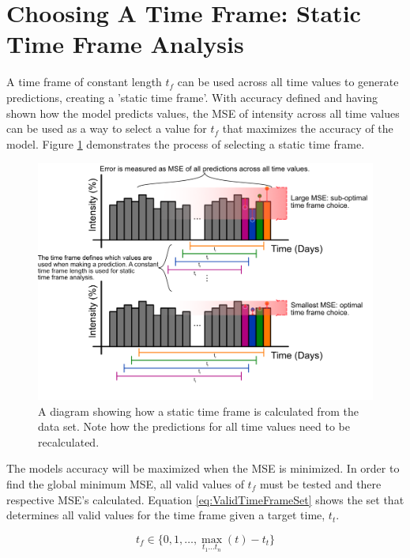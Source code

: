 \section{Choosing A Time Frame: Static Time Frame Analysis}
\label{sec:TimeFrameStaticTimeFrameAnalysis}

A time frame of constant length $t_f$ can be used across all time values to generate predictions, creating a 'static time frame'. With accuracy defined and having shown how the model predicts values, the MSE of intensity across all time values can be used as a way to select a value for $t_f$ that maximizes the accuracy of the model. Figure \ref{fig:StaticTimeFrameDiagram} demonstrates the process of selecting a static time frame.

\begin{figure}[h]
    \centering
    \includegraphics[width=150mm]{Diagrams/StaticTimeFrameDiagram.png}
    \caption{A diagram showing how a static time frame is calculated from the data set. Note how the predictions for all time values need to be recalculated.}
    \label{fig:StaticTimeFrameDiagram}
\end{figure}

The models accuracy will be maximized when the MSE is minimized. In order to find the global minimum MSE, all valid values of $t_f$ must be tested and there respective MSE's calculated. Equation \ref{eq:ValidTimeFrameSet} shows the set that determines all valid values for the time frame given a target time, $t_t$.

\begin{equation}
    \label{eq:ValidTimeFrameSet}
    t_f \in \{ 0, 1, \dots , \max_{t_1\dots t_n}( t )-t_t \}
\end{equation}

